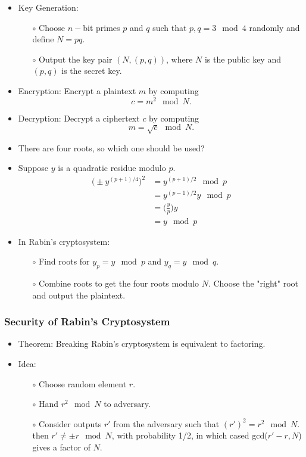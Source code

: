 \documentclass[a4paper]{scrartcl}
\begin{document}
\begin{itemize}
\item Key Generation:
\begin{itemize}
\item [$\circ$] Choose $n-$bit primes $p$ and $q$ such that $p,q = 3 \mod 4$ randomly and define $N = pq$.
\item [$\circ$] Output the key pair $(N, (p,q))$, where $N$ is the public key and $(p,q)$ is the secret key.
\end{itemize}
\item Encryption: Encrypt a plaintext $m$ by computing $$c = m^2 \mod N.$$
\item Decryption: Decrypt a ciphertext $c$ by computing $$m = \sqrt{c} \mod N.$$
\item There are four roots, so which one should be used?
\item Suppose $y$ is a quadratic residue modulo $p$.
\begin{align*}
\Big(\pm y^{(p+1)/4}\Big)^2 &= y^{(p+1)/2} \mod p \\
&= y^{(p-1)/2} y \mod p \\
&= \bigg(\frac{y}{p}\bigg) y \\
&= y \mod p
\end{align*}
\item In Rabin's cryptosystem:
\begin{itemize}
\item [$\circ$] Find roots for $y_p = y \mod p$ and $y_q = y \mod q$.
\item [$\circ$] Combine roots to get the four roots modulo $N$. Choose the "right" root and output the plaintext.
\end{itemize}
\end{itemize}

\subsubsection*{Security of Rabin's Cryptosystem}

\begin{itemize}
\item Theorem: Breaking Rabin's cryptosystem is equivalent to factoring.
\item Idea:
\begin{itemize}
\item [$\circ$] Choose random element $r$.
\item [$\circ$] Hand $r^2 \mod N$ to adversary.
\item [$\circ$] Consider outputs $r'$ from the adversary such that $(r')^2 = r^2 \mod N$. then $r' \neq \pm r \mod N$, with probability 1/2, in which cased gcd($r' - r, N$) gives a factor of $N$.
\end{itemize}
\end{itemize}
\end{document}
